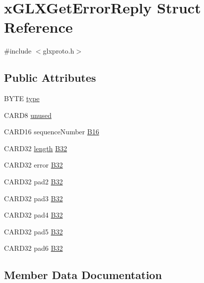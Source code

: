 \hypertarget{structx_g_l_x_get_error_reply}{}\section{x\+G\+L\+X\+Get\+Error\+Reply Struct Reference}
\label{structx_g_l_x_get_error_reply}


{\ttfamily \#include $<$glxproto.\+h$>$}

\subsection*{Public Attributes}
\begin{DoxyCompactItemize}
\item 
B\+Y\+TE \hyperlink{structx_g_l_x_get_error_reply_a67d3f8cac29d9ca6263bf9832d712ca4}{type}
\item 
C\+A\+R\+D8 \hyperlink{structx_g_l_x_get_error_reply_aedaec7cad26ee9826e380a3e03f2a61f}{unused}
\item 
C\+A\+R\+D16 sequence\+Number \hyperlink{structx_g_l_x_get_error_reply_a0241c56211ac1fd870248dbf0411b4ff}{B16}
\item 
C\+A\+R\+D32 \hyperlink{glcorearb_8h_ab9c919755bde3b34349e23a32b4e0fa7}{length} \hyperlink{structx_g_l_x_get_error_reply_abbacf19dbab79a196341c96b93426eee}{B32}
\item 
C\+A\+R\+D32 error \hyperlink{structx_g_l_x_get_error_reply_a094f7d012e47067074a9a0e0e60743b1}{B32}
\item 
C\+A\+R\+D32 pad2 \hyperlink{structx_g_l_x_get_error_reply_a2c2a044e95305092072394ca3107899a}{B32}
\item 
C\+A\+R\+D32 pad3 \hyperlink{structx_g_l_x_get_error_reply_ad5a8a837c139cc267aeb0ef8749f6167}{B32}
\item 
C\+A\+R\+D32 pad4 \hyperlink{structx_g_l_x_get_error_reply_afcee5fe5a6dcda621a64ef823697fb9e}{B32}
\item 
C\+A\+R\+D32 pad5 \hyperlink{structx_g_l_x_get_error_reply_aca170ef4a072311f89e06cf268241ed9}{B32}
\item 
C\+A\+R\+D32 pad6 \hyperlink{structx_g_l_x_get_error_reply_aaef4c722f4f4eaaa97e10bc8ae0fb27f}{B32}
\end{DoxyCompactItemize}


\subsection{Member Data Documentation}
\mbox{\label{structx_g_l_x_get_error_reply_a0241c56211ac1fd870248dbf0411b4ff}} 
